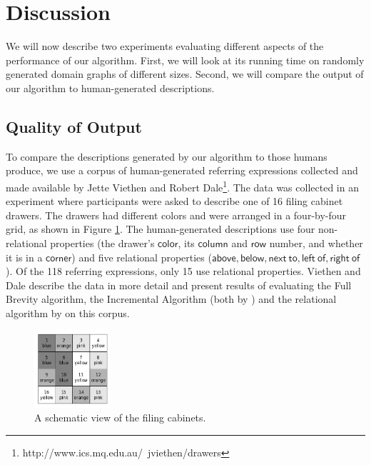 \section{Discussion} \label{sec:discussion}

We will now describe two experiments evaluating different aspects of
the performance of our algorithm. First, we will look at its running
time on randomly generated domain graphs of different sizes. Second,
we will compare the output of our algorithm to human-generated
descriptions.



\subsection{Quality of Output}

To compare the descriptions generated by our algorithm to
those humans produce, we use a corpus of
human-generated referring expressions collected and made available by
Jette Viethen and Robert
Dale\footnote{http://www.ics.mq.edu.au/~jviethen/drawers}.  The data
was collected in an experiment where participants were asked to
describe one of 16 filing cabinet drawers. The drawers had different
colors and were arranged in a four-by-four grid, as shown in Figure
\ref{fig:drawers}. The human-generated descriptions use four
non-relational properties (the drawer's $\mathsf{color}$, its $\mathsf{column}$ and
$\mathsf{row}$ number, and whether it is in a $\mathsf{corner}$) and five
relational properties ($\mathsf{above, below, next\ to, left\ of,
right\ of}$). Of the 118 referring expressions, only 15 use relational properties.
Viethen and Dale 
describe the data in more detail and present results of evaluating the
Full Brevity algorithm, the Incremental Algorithm (both by
\cite{Dale1995}) and the relational algorithm by
\cite{dale91:_gener_refer_expres_invol_relat} on this corpus.


\begin{figure}
\begin{center}
\includegraphics[width=0.25\textwidth]{drawers.png}
\end{center}\vspace*{-3ex}
\caption{A schematic view of the filing cabinets.}\label{fig:drawers}\vspace*{-3ex}
\end{figure}


